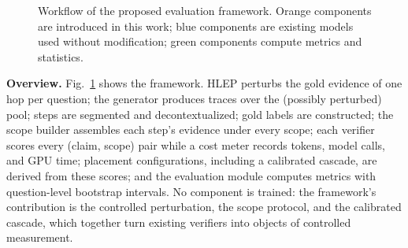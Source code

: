 \documentclass[conference]{IEEEtran}
\newcommand{\ctil}{\tilde{c}}
\begin{document}
\begin{figure}[t]
\caption{Workflow of the proposed evaluation framework. Orange components are introduced in this work; blue components are existing models used without modification; green components compute metrics and statistics.}\label{fig:workflow}
\end{figure}

\textbf{Overview.} Fig.~\ref{fig:workflow} shows the framework. HLEP perturbs the gold evidence of one hop per question; the generator produces traces over the (possibly perturbed) pool; steps are segmented and decontextualized; gold labels are constructed; the scope builder assembles each step's evidence under every scope; each verifier scores every (claim, scope) pair while a cost meter records tokens, model calls, and GPU time; placement configurations, including a calibrated cascade, are derived from these scores; and the evaluation module computes metrics with question-level bootstrap intervals. No component is trained: the framework's contribution is the controlled perturbation, the scope protocol, and the calibrated cascade, which together turn existing verifiers into objects of controlled measurement.
\end{document}
